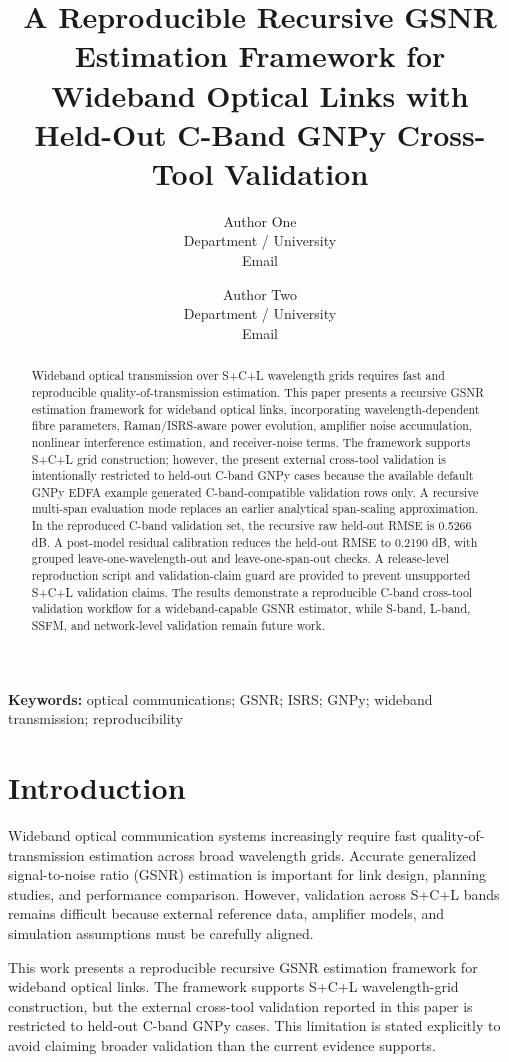 \documentclass[twocolumn]{article}
\title{A Reproducible Recursive GSNR Estimation Framework for Wideband Optical Links with Held-Out C-Band GNPy Cross-Tool Validation}
\author{
Author One\\
Department / University\\
Email
\and
Author Two\\
Department / University\\
Email
}
\date{}
\begin{document}
\maketitle

\begin{abstract}
Wideband optical transmission over S+C+L wavelength grids requires fast and reproducible quality-of-transmission estimation. This paper presents a recursive GSNR estimation framework for wideband optical links, incorporating wavelength-dependent fibre parameters, Raman/ISRS-aware power evolution, amplifier noise accumulation, nonlinear interference estimation, and receiver-noise terms. The framework supports S+C+L grid construction; however, the present external cross-tool validation is intentionally restricted to held-out C-band GNPy cases because the available default GNPy EDFA example generated C-band-compatible validation rows only. A recursive multi-span evaluation mode replaces an earlier analytical span-scaling approximation. In the reproduced C-band validation set, the recursive raw held-out RMSE is 0.5266 dB. A post-model residual calibration reduces the held-out RMSE to 0.2190 dB, with grouped leave-one-wavelength-out and leave-one-span-out checks. A release-level reproduction script and validation-claim guard are provided to prevent unsupported S+C+L validation claims. The results demonstrate a reproducible C-band cross-tool validation workflow for a wideband-capable GSNR estimator, while S-band, L-band, SSFM, and network-level validation remain future work.
\end{abstract}

\textbf{Keywords:} optical communications; GSNR; ISRS; GNPy; wideband transmission; reproducibility

\section{Introduction}
Wideband optical communication systems increasingly require fast quality-of-transmission estimation across broad wavelength grids. Accurate generalized signal-to-noise ratio (GSNR) estimation is important for link design, planning studies, and performance comparison. However, validation across S+C+L bands remains difficult because external reference data, amplifier models, and simulation assumptions must be carefully aligned.

This work presents a reproducible recursive GSNR estimation framework for wideband optical links. The framework supports S+C+L wavelength-grid construction, but the external cross-tool validation reported in this paper is restricted to held-out C-band GNPy cases. This limitation is stated explicitly to avoid claiming broader validation than the current evidence supports.
\end{document}
